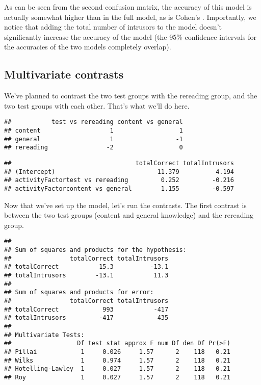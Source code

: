 \documentclass[11pt,]{article}
\begin{document}
As can be seen from the second confusion matrix, the accuracy of this
model is actually somewhat higher than in the full model, as is Cohen's
\textkappa. Importantly, we notice that adding the total number of
intrusors to the model doesn't significantly increase the accuracy of
the model (the 95\% confidence intervals for the accuracies of the two
models completely overlap).

\hypertarget{multivariate-contrasts}{%
\subsection{Multivariate contrasts}\label{multivariate-contrasts}}

We've planned to contrast the two test groups with the rereading group,
and the two test groups with each other. That's what we'll do here.

\begin{verbatim}
##           test vs rereading content vs general
## content                   1                  1
## general                   1                 -1
## rereading                -2                  0
\end{verbatim}

\begin{verbatim}
##                                  totalCorrect totalIntrusors
## (Intercept)                            11.379          4.194
## activityFactortest vs rereading         0.252         -0.216
## activityFactorcontent vs general        1.155         -0.597
\end{verbatim}

Now that we've set up the model, let's run the contrasts. The first
contrast is between the two test groups (content and general knowledge)
and the rereading group.

\begin{verbatim}
## 
## Sum of squares and products for the hypothesis:
##                totalCorrect totalIntrusors
## totalCorrect           15.3          -13.1
## totalIntrusors        -13.1           11.3
## 
## Sum of squares and products for error:
##                totalCorrect totalIntrusors
## totalCorrect            993           -417
## totalIntrusors         -417            435
## 
## Multivariate Tests: 
##                  Df test stat approx F num Df den Df Pr(>F)
## Pillai            1     0.026     1.57      2    118   0.21
## Wilks             1     0.974     1.57      2    118   0.21
## Hotelling-Lawley  1     0.027     1.57      2    118   0.21
## Roy               1     0.027     1.57      2    118   0.21
\end{verbatim}
\end{document}
